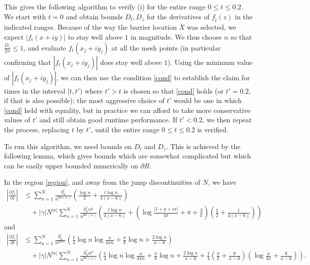 This gives the following algorithm to verify (i) for the entire range $0 \leq t \leq 0.2$.  We start with $t=0$ and obtain bounds $D_t, D_z$ for the derivatives of $f_{\tilde t}(z)$ in the indicated ranges.  Because of the way the barrier location $X$ was selected, we expect $|f_t(x+iy)|$ to stay well above $1$ in magnitude.  We thus choose $n$ so that $\frac{D_z}{2n} \leq 1$, and evaluate $f_t(x_j+iy_j)$ at all the mesh points (in particular confirming that $|f_t(x_j+iy_j)|$ does stay well above $1$).  Using the minimum value of $|f_t(x_j+iy_j)|$, we can then use the condition \eqref{cond} to establish the claim for times in the interval $[t,t')$ where $t'>t$ is chosen so that \eqref{cond} holds (or $t'=0.2$, if that is also possible); the most aggressive choice of $t'$ would be one in which \eqref{cond} held with equality, but in practice we can afford to take more conservative values of $t'$ and still obtain good runtime performance.  If $t' < 0.2$, we then repeat the process, replacing $t$ by $t'$, until the entire range $0 \leq t \leq 0.2$ is verified.

To run this algorithm, we need bounds on $D_t$ and $D_z$.  This is achieved by the following lemma, which gives bounds which are somewhat complicated but which can be easily upper bounded numerically on $\partial R$:

\begin{lemma} In the region \eqref{region}, and away from the jump discontinuities of $N$, we have
\begin{align*}
 \left|\frac{\partial f_t}{\partial z}\right| &\leq  \sum_{n=1}^N \frac{b_n^t}{n^{\mathrm{Re}(s_*)}} \left(\frac{\log n}{2} + \frac{t \log n}{4(x-6)}\right) \\
&\quad + |\gamma| N^{|\kappa|} \sum_{n=1}^N \frac{b_n^t n^{y} }{n^{\mathrm{Re}(s_{*})}}
\left( \frac{t \log n}{4(x-6)} + \left(\log \frac{|1+y+ix|}{4\pi} + \pi + \frac{3}{x}\right) \left(\frac{1}{2} + \frac{t}{4(x-6)}\right)\right)
\end{align*}
and
\begin{align*} \left|\frac{\partial f_t}{\partial t}\right| &\leq \sum_{n=1}^N \frac{b_n^t}{n^{\mathrm{Re} s_*}} \left(\frac{1}{4} \log n \log \frac{x}{4\pi n} + \frac{\pi}{8} \log n + \frac{2 \log n}{x-6}\right) \\
&\quad + |\gamma| N^{|\kappa|} \sum_{n=1}^N \frac{b_n^t n^y}{n^{\mathrm{Re}(s_{*})}}
\left(\frac{1}{4} \log n \log \frac{x}{4\pi n} + \frac{\pi}{8} \log n + \frac{2 \log n}{x-6} + \frac{1}{4} \left(\frac{\pi}{2} + \frac{8}{x-6}\right) \left(\log \frac{x}{4\pi} + \frac{8}{x-6}\right)\right).
\end{align*}
\end{lemma}

